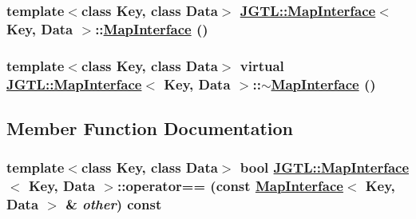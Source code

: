 \hypertarget{class_j_g_t_l_1_1_map_interface_6d49e996123c82dbc4ac2b526de5225d}{
\subsubsection[MapInterface]{\setlength{\rightskip}{0pt plus 5cm}template$<$class Key, class Data$>$ \hyperlink{class_j_g_t_l_1_1_map_interface}{JGTL::Map\-Interface}$<$ Key, Data $>$::\hyperlink{class_j_g_t_l_1_1_map_interface}{Map\-Interface} ()}}
\label{class_j_g_t_l_1_1_map_interface_6d49e996123c82dbc4ac2b526de5225d}


\hypertarget{class_j_g_t_l_1_1_map_interface_f6fd6f5a7643f34cae4b7b67ba98a832}{
\subsubsection[$\sim$MapInterface]{\setlength{\rightskip}{0pt plus 5cm}template$<$class Key, class Data$>$ virtual \hyperlink{class_j_g_t_l_1_1_map_interface}{JGTL::Map\-Interface}$<$ Key, Data $>$::$\sim$\hyperlink{class_j_g_t_l_1_1_map_interface}{Map\-Interface} ()}}
\label{class_j_g_t_l_1_1_map_interface_f6fd6f5a7643f34cae4b7b67ba98a832}




\subsection{Member Function Documentation}
\hypertarget{class_j_g_t_l_1_1_map_interface_2f61fdf95543ba566256642eeed659f4}{
\subsubsection[operator==]{\setlength{\rightskip}{0pt plus 5cm}template$<$class Key, class Data$>$ bool \hyperlink{class_j_g_t_l_1_1_map_interface}{JGTL::Map\-Interface}$<$ Key, Data $>$::operator== (const \hyperlink{class_j_g_t_l_1_1_map_interface}{Map\-Interface}$<$ Key, Data $>$ \& {\em other}) const}}
\label{class_j_g_t_l_1_1_map_interface_2f61fdf95543ba566256642eeed659f4}


